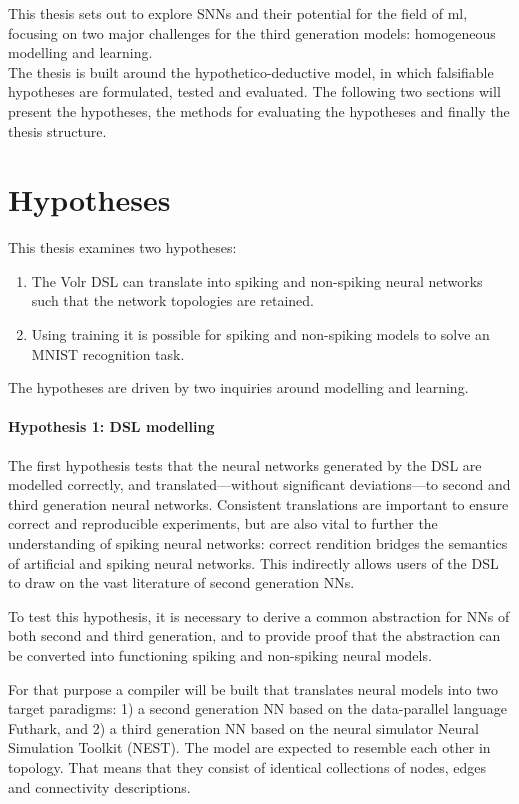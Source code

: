 This thesis sets out to explore \glspl{SNN} and their potential for the 
field of \gls{ml}, focusing on two major challenges for the
third generation models: homogeneous modelling and learning.
\\[0.1cm]

The thesis is built around the hypothetico-deductive model, in which 
falsifiable hypotheses are formulated, tested and evaluated.
The following two sections will present the hypotheses, the methods for
evaluating the hypotheses and finally the thesis structure.

\section{Hypotheses} \label{sec:hypotheses}
This thesis examines two hypotheses:

\begin{enumerate}
  \item The Volr DSL can translate into spiking and non-spiking neural networks such that the network topologies are retained.
  \item Using training it is possible for spiking and non-spiking models to solve an MNIST recognition task.
\end{enumerate}

The hypotheses are driven by two inquiries around modelling and learning.

\paragraph{Hypothesis 1: DSL modelling}
The first hypothesis tests that the neural networks generated by the DSL are
modelled correctly, and translated---without significant
deviations---to second and third generation neural networks.
Consistent translations are important to ensure correct and reproducible experiments,
but are also vital to further the understanding of spiking neural networks:
correct rendition bridges the semantics of artificial and spiking neural networks.
This indirectly allows users of the DSL to draw on the vast literature of
second generation \gls{NN}s.

To test this hypothesis, it is necessary to derive a common abstraction for
\glspl{NN} of both second and third generation, and to provide proof that the
abstraction can be converted into functioning spiking and non-spiking neural
models.

For that purpose a compiler will be built that translates neural models
into two target paradigms:
  1) a second generation \gls{NN} based on the data-parallel language Futhark, and
  2) a third generation \gls{NN} based on the neural simulator Neural Simulation
  Toolkit (NEST).
  The model are expected to resemble each other in topology. 
That means that they consist of identical collections of nodes, edges
and connectivity descriptions.

